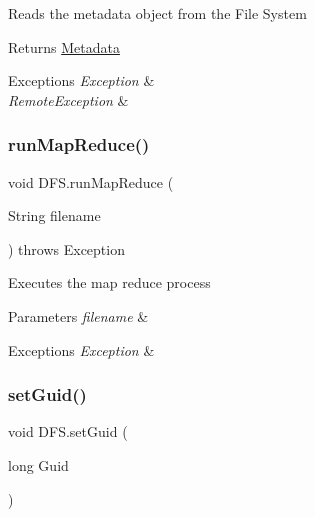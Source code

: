 Reads the metadata object from the File System \begin{DoxyReturn}{Returns}
\mbox{\hyperlink{class_metadata}{Metadata}} 
\end{DoxyReturn}

\begin{DoxyExceptions}{Exceptions}
{\em Exception} & \\
\hline
{\em Remote\+Exception} & \\
\hline
\end{DoxyExceptions}
\mbox{\label{class_d_f_s_a51479394a5d22157cc1ee1244d294d00}} 
\subsubsection{\texorpdfstring{run\+Map\+Reduce()}{runMapReduce()}}
{\footnotesize\ttfamily void D\+F\+S.\+run\+Map\+Reduce (\begin{DoxyParamCaption}\item[{String}]{filename }\end{DoxyParamCaption}) throws Exception\hspace{0.3cm}{\ttfamily [inline]}}

Executes the map reduce process 
\begin{DoxyParams}{Parameters}
{\em filename} & \\
\hline
\end{DoxyParams}

\begin{DoxyExceptions}{Exceptions}
{\em Exception} & \\
\hline
\end{DoxyExceptions}
\mbox{\label{class_d_f_s_a2b7fc8baa8a13aef60da87bde16eb0b3}} 
\subsubsection{\texorpdfstring{set\+Guid()}{setGuid()}}
{\footnotesize\ttfamily void D\+F\+S.\+set\+Guid (\begin{DoxyParamCaption}\item[{long}]{Guid }\end{DoxyParamCaption})\hspace{0.3cm}{\ttfamily [inline]}}

